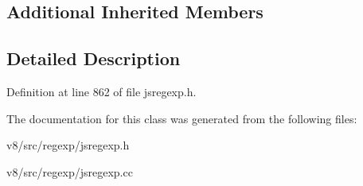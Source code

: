\subsection*{Additional Inherited Members}


\subsection{Detailed Description}


Definition at line 862 of file jsregexp.\+h.



The documentation for this class was generated from the following files\+:\begin{DoxyCompactItemize}
\item 
v8/src/regexp/jsregexp.\+h\item 
v8/src/regexp/jsregexp.\+cc\end{DoxyCompactItemize}
